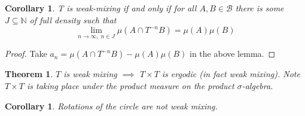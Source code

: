 \documentclass[11pt]{article}
\newcommand{\N}{\mathbb{N}}
\newtheorem{theorem}[prop]{Theorem}
\newtheorem{cor}[prop]{Corollary}
\begin{document}
\begin{cor}
	T is weak-mixing if and only if for all $A,B \in \mathcal{B}$ there is some $J\subseteq\N$ of full density such that
	\[
		\lim_{n\to\infty, \; n\in J}\mu(A\cap T^{-n}B) = \mu(A)\mu(B)
	\]
\end{cor}

\begin{proof}
Take $a_n = \mu(A \cap T^{-n}B) - \mu(A)\mu(B)$ in the above lemma.
\end{proof}

\begin{theorem}
$T$ is weak mixing $\implies$ $T\times T$ is ergodic (in fact weak mixing).
Note $T\times T$ is taking place under the product measure on the product $\sigma$-algebra.
\end{theorem}

\begin{cor}
Rotations of the circle are not weak mixing.
\end{cor}
\end{document}
